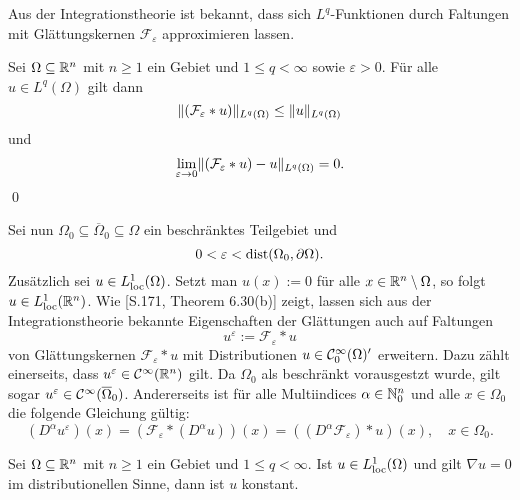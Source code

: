 Aus der Integrationstheorie ist bekannt, dass sich $L^q$-Funktionen durch Faltungen mit Glättungskernen $\mathcal{F}_\varepsilon$ approximieren lassen.

\begin{lem}
  \label{lem:mollification}
  Sei $\Omega \subseteq \mathbb{R}^n$ mit $n \geq 1$ ein Gebiet und $1 \leq q < \infty$ sowie $\varepsilon > 0$.
  Für alle $u \in L^q(\Omega)$ gilt dann
  $$
  \lVert (\mathcal{F}_\varepsilon \ast u) \rVert_{L^q(\Omega)} \leq  \lVert u \rVert_{L^q(\Omega)}
  $$
  und
  \begin{displaymath}
    \lim_{\varepsilon \to 0} \lVert (\mathcal{F}_\varepsilon \ast u) - u \rVert_{L^q(\Omega)} = 0. 
  \end{displaymath}
  \qed
\end{lem}

Sei nun $\Omega_0 \subseteq \overline\Omega_0 \subseteq \Omega$ ein beschränktes Teilgebiet und
\begin{equation}
  \label{eq:convolutionEpsilon}
  0 < \varepsilon < \operatorname{dist}(\Omega_0, \partial\Omega).
\end{equation}
Zusätzlich sei $u \in L^1_{\operatorname{loc}}(\Omega)$.
Setzt man $u(x) := 0$ für alle $x \in \mathbb{R}^n \setminus \Omega$, so folgt $u \in L^1_{\operatorname{loc}}(\mathbb{R}^n)$.
Wie \cite{rudin1991fa}[S.171, Theorem 6.30(b)] zeigt, lassen sich aus der Integrationstheorie bekannte Eigenschaften der Glättungen auch auf Faltungen 
$$
u^\varepsilon := \mathcal{F}_\varepsilon \ast u
$$
von Glättungskernen $\mathcal{F}_\varepsilon \ast u$ mit Distributionen $u \in \mathcal{C}_0^\infty(\Omega)'$ erweitern.
Dazu zählt einerseits, dass $u^\varepsilon \in \mathcal{C}^\infty(\mathbb{R}^n)$ gilt.
Da $\Omega_0$ als beschränkt vorausgestzt wurde, gilt sogar $u^\varepsilon \in \mathcal{C}^\infty(\overline\Omega_0)$.
Andererseits ist für alle Multiindices $\alpha \in \mathbb{N}_0^n$ und alle $x \in \Omega_0$ die folgende Gleichung gültig:
\begin{equation}
  \label{eq:convolutionDiff}
  (D^\alpha u^\varepsilon)(x) 
  = (\mathcal{F}_\varepsilon \ast (D^\alpha u))(x)
  = ( (D^\alpha \mathcal{F}_\varepsilon) \ast u)(x), \quad x \in \Omega_0.
\end{equation}

\begin{lem}
  Sei $\Omega \subseteq \mathbb{R}^n$ mit $n \geq 1$ ein Gebiet und $1 \leq q < \infty$.
  Ist $u \in L^1_{\operatorname{loc}}(\Omega)$ und gilt $\nabla u = 0$ im distributionellen Sinne, dann ist $u$ konstant.
\end{lem}

